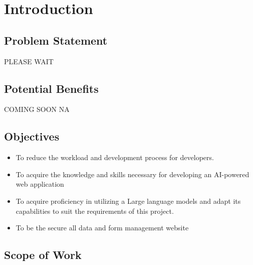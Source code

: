 \documentclass[12pt,oneside,openright,a4paper]{cpe-english-project}
\begin{document}



\chapter{Introduction}

\section{Problem Statement} 

PLEASE WAIT

\section{Potential Benefits}

COMING SOON NA 



\section{Objectives}
\begin{itemize}
\item   To reduce the workload and development process for developers. 
\item   To acquire the knowledge and skills necessary for developing an AI-powered web
application
\item To acquire proficiency in utilizing a Large language models and adapt its capabilities to suit the
requirements of this project.
\item  To be the secure all data and form management website
\end{itemize}


\section{Scope of Work}
\end{document}
